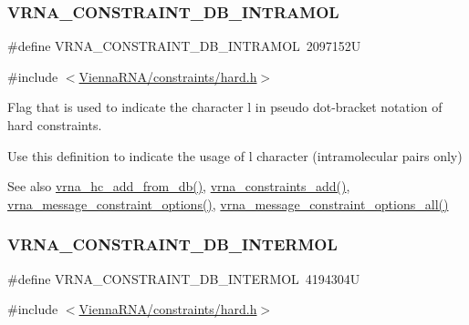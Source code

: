 \subsubsection{\texorpdfstring{VRNA\_CONSTRAINT\_DB\_INTRAMOL}{VRNA\_CONSTRAINT\_DB\_INTRAMOL}}
{\footnotesize\ttfamily \#define V\+R\+N\+A\+\_\+\+C\+O\+N\+S\+T\+R\+A\+I\+N\+T\+\_\+\+D\+B\+\_\+\+I\+N\+T\+R\+A\+M\+OL~2097152U}



{\ttfamily \#include $<$\mbox{\hyperlink{hard_8h}{Vienna\+R\+N\+A/constraints/hard.\+h}}$>$}



Flag that is used to indicate the character \textquotesingle{}l\textquotesingle{} in pseudo dot-\/bracket notation of hard constraints. 

Use this definition to indicate the usage of \textquotesingle{}l\textquotesingle{} character (intramolecular pairs only)

\begin{DoxySeeAlso}{See also}
\mbox{\hyperlink{group__hard__constraints_ga5b4de3247b67358080c176b94591a8e6}{vrna\+\_\+hc\+\_\+add\+\_\+from\+\_\+db()}}, \mbox{\hyperlink{group__constraints_ga35a401f680969a556858a8dd5f1d07cc}{vrna\+\_\+constraints\+\_\+add()}}, \mbox{\hyperlink{group__constraints_gaa1f20b53bf09ac2e6b0dbb13f7d89670}{vrna\+\_\+message\+\_\+constraint\+\_\+options()}}, \mbox{\hyperlink{group__constraints_gaec7e13fa0465c2acc7a621d1aecb709f}{vrna\+\_\+message\+\_\+constraint\+\_\+options\+\_\+all()}} 
\end{DoxySeeAlso}
\mbox{\label{group__hard__constraints_ga31d0ebb9755ca8a4acafc14f00ca755d}} 
\subsubsection{\texorpdfstring{VRNA\_CONSTRAINT\_DB\_INTERMOL}{VRNA\_CONSTRAINT\_DB\_INTERMOL}}
{\footnotesize\ttfamily \#define V\+R\+N\+A\+\_\+\+C\+O\+N\+S\+T\+R\+A\+I\+N\+T\+\_\+\+D\+B\+\_\+\+I\+N\+T\+E\+R\+M\+OL~4194304U}



{\ttfamily \#include $<$\mbox{\hyperlink{hard_8h}{Vienna\+R\+N\+A/constraints/hard.\+h}}$>$}



